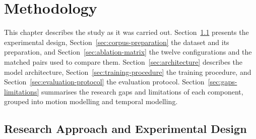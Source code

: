 %
%

\chapter{Methodology}
\label{ch:methodology}

This chapter describes the study as it was carried out. Section~\ref{sec:research-approach} presents the experimental design, Section~\ref{sec:corpus-preparation} the dataset and its preparation, and Section~\ref{sec:ablation-matrix} the twelve configurations and the matched pairs used to compare them. Section~\ref{sec:architecture} describes the model architecture, Section~\ref{sec:training-procedure} the training procedure, and Section~\ref{sec:evaluation-protocol} the evaluation protocol. Section~\ref{sec:gaps-limitations} summarises the research gaps and limitations of each component, grouped into motion modelling and temporal modelling.


\section{Research Approach and Experimental Design}
\label{sec:research-approach}

